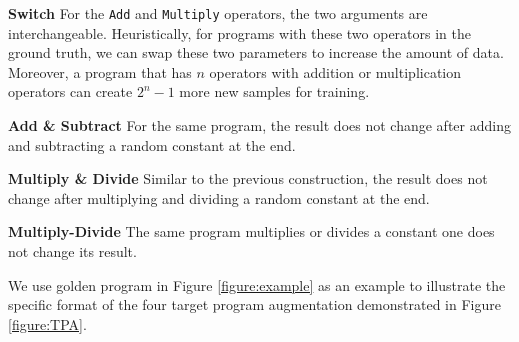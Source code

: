 \documentclass[11pt]{article}
\begin{document}
\textbf{Switch} For the  \texttt{Add} and \texttt{Multiply} operators, the two arguments are interchangeable. Heuristically, for programs with these two operators in the ground truth, we can swap these two parameters to increase the amount of data. Moreover, a program that has $n$ operators with addition or multiplication operators can create $2^{n}-1$ more new samples for training.

\textbf{Add \& Subtract} For the same program, the result does not change after adding and subtracting a random constant at the end. 

\textbf{Multiply \& Divide} Similar to the previous construction, the result does not change after multiplying and dividing a random constant at the end. 

\textbf{Multiply-Divide} The same program multiplies or divides a constant one does not change its result.

We use golden program in Figure \ref{figure:example} as an example to illustrate the specific format of the four target program augmentation demonstrated in Figure \ref{figure:TPA}.
\end{document}
